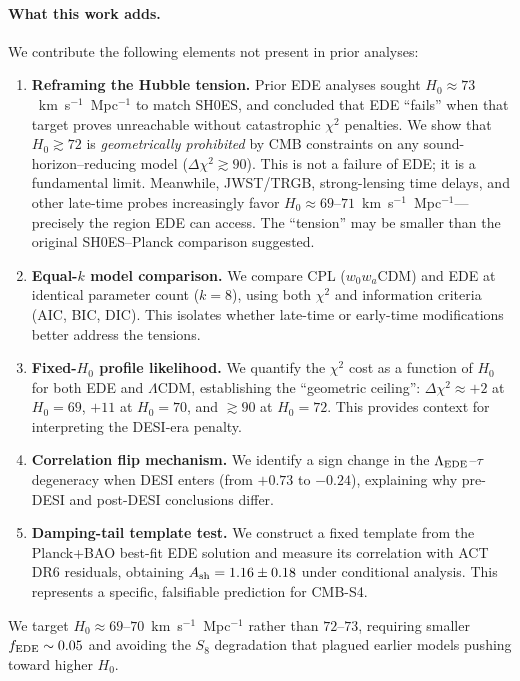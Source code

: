 \documentclass[a4paper,11pt]{article}
\begin{document}
\paragraph{What this work adds.}
We contribute the following elements not present in prior analyses:
\begin{enumerate}
\item \textbf{Reframing the Hubble tension.} Prior EDE analyses sought $H_0 \approx 73$~km~s$^{-1}$~Mpc$^{-1}$ to match SH0ES, and concluded that EDE ``fails'' when that target proves unreachable without catastrophic $\chi^2$ penalties. We show that $H_0 \gtrsim 72$ is \emph{geometrically prohibited} by CMB constraints on any sound-horizon--reducing model ($\Delta\chi^2 \gtrsim 90$). This is not a failure of EDE; it is a fundamental limit. Meanwhile, JWST/TRGB, strong-lensing time delays, and other late-time probes increasingly favor $H_0 \approx 69$--$71$~km~s$^{-1}$~Mpc$^{-1}$---precisely the region EDE can access. The ``tension'' may be smaller than the original SH0ES--Planck comparison suggested.

\item \textbf{Equal-$k$ model comparison.} We compare CPL ($w_0 w_a$CDM) and EDE at identical parameter count ($k = 8$), using both $\chi^2$ and information criteria (AIC, BIC, DIC). This isolates whether late-time or early-time modifications better address the tensions.

\item \textbf{Fixed-$H_0$ profile likelihood.} We quantify the $\chi^2$ cost as a function of $H_0$ for both EDE and $\Lambda$CDM, establishing the ``geometric ceiling'': $\Delta\chi^2 \approx +2$ at $H_0 = 69$, $+11$ at $H_0 = 70$, and $\gtrsim 90$ at $H_0 = 72$. This provides context for interpreting the DESI-era penalty.

\item \textbf{Correlation flip mechanism.} We identify a sign change in the $\Lambda_{\rm EDE}$--$\tau$ degeneracy when DESI enters (from $+0.73$ to $-0.24$), explaining why pre-DESI and post-DESI conclusions differ.

\item \textbf{Damping-tail template test.} We construct a fixed template from the Planck+BAO best-fit EDE solution and measure its correlation with ACT DR6 residuals, obtaining $A_{\rm sh} = 1.16 \pm 0.18$ under conditional analysis. This represents a specific, falsifiable prediction for CMB-S4.
\end{enumerate}
We target $H_0 \approx 69$--$70$~km~s$^{-1}$~Mpc$^{-1}$ rather than $72$--$73$, requiring smaller $f_{\rm EDE} \sim 0.05$ and avoiding the $S_8$ degradation that plagued earlier models pushing toward higher $H_0$.
\end{document}
